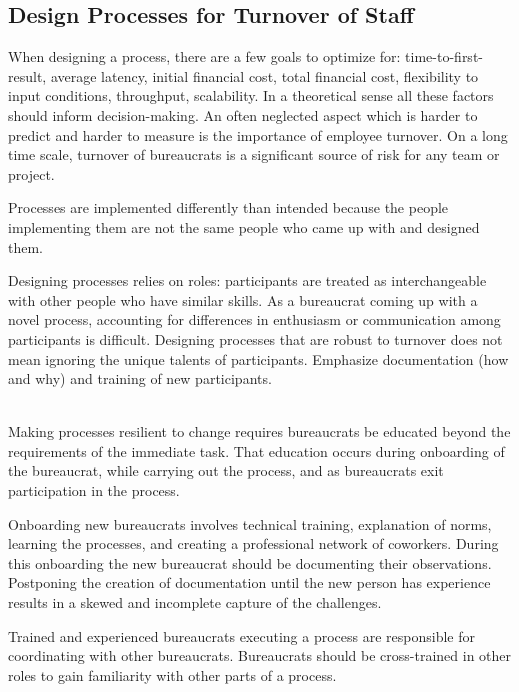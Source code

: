 \subsection*{Design Processes for Turnover of Staff\label{sec:turnover}}


When designing a \gls{process}, there are a few goals to optimize for: time-to-first-result, average latency, initial financial cost, total financial cost, flexibility to input conditions, throughput, scalability. In a theoretical sense all these factors should inform decision-making. An often neglected aspect which is harder to predict and harder to measure is the importance of employee turnover. On a long time scale, turnover of \glspl{bureaucrat} is a significant source of risk for any team or project. 

Processes are implemented differently than intended because the people implementing them are not the same people who came up with and designed them.

Designing processes relies on roles: participants are treated as interchangeable with other people who have similar skills. As a bureaucrat coming up with a novel process, accounting for differences in enthusiasm or communication among participants is difficult. 
Designing processes that are robust to turnover does not mean ignoring the unique talents of participants. 
Emphasize documentation (how and why) and training of new participants. 



\ \\

Making processes resilient to change requires  bureaucrats be educated beyond the requirements of the immediate task. That education occurs during onboarding of the bureaucrat, while carrying out the process, and as bureaucrats exit participation in the process. 

Onboarding new bureaucrats involves technical training, explanation of norms, learning the processes, and creating a professional network of coworkers. During this onboarding the new bureaucrat should be documenting their observations. Postponing the creation of documentation until the new person has experience results in a skewed and incomplete capture of the challenges.

Trained and experienced bureaucrats executing a process are responsible for coordinating with other bureaucrats. Bureaucrats should be cross-trained in other roles to gain familiarity with other parts of a process. 

